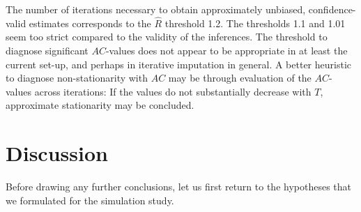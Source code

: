 \documentclass[Royal,times,sageh]{sagej}
\begin{document}
The number of iterations necessary to obtain approximately unbiased, confidence-valid estimates corresponds to the \(\widehat{R}\) threshold 1.2. The thresholds 1.1 and 1.01 seem too strict compared to the validity of the inferences. The threshold to diagnose significant \(AC\)-values does not appear to be appropriate in at least the current set-up, and perhaps in iterative imputation in general. A better heuristic to diagnose non-stationarity with \(AC\) may be through evaluation of the \(AC\)-values across iterations: If the values do not substantially decrease with \(T\), approximate stationarity may be concluded.

\hypertarget{discussion}{%
\section{Discussion}\label{discussion}}

Before drawing any further conclusions, let us first return to the hypotheses that we formulated for the simulation study.
\end{document}
